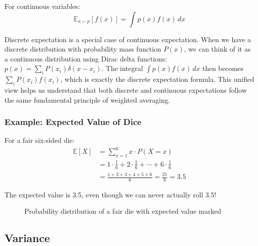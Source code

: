 For continuous variables:
\begin{equation}
\mathbb{E}_{x \sim p}[f(x)] = \int p(x) f(x) \, dx
\end{equation}

\begin{remark}
Discrete expectation is a special case of continuous expectation. When we have a discrete distribution with probability mass function $P(x)$, we can think of it as a continuous distribution using Dirac delta functions: $p(x) = \sum_i P(x_i) \delta(x - x_i)$. The integral $\int p(x) f(x) \, dx$ then becomes $\sum_i P(x_i) f(x_i)$, which is exactly the discrete expectation formula. This unified view helps us understand that both discrete and continuous expectations follow the same fundamental principle of weighted averaging.
\end{remark}

\subsubsection{Example: Expected Value of Dice}

For a fair six-sided die:
\begin{align}
\mathbb{E}[X] &= \sum_{x=1}^{6} x \cdot P(X=x) \\
&= 1 \cdot \frac{1}{6} + 2 \cdot \frac{1}{6} + \cdots + 6 \cdot \frac{1}{6} \\
&= \frac{1+2+3+4+5+6}{6} = \frac{21}{6} = 3.5
\end{align}

The expected value is 3.5, even though we can never actually roll 3.5!

\begin{figure}[h]
\centering
{}
\caption{Probability distribution of a fair die with expected value marked}
\label{fig:dice-expectation}
\end{figure}

\subsection{Variance}

